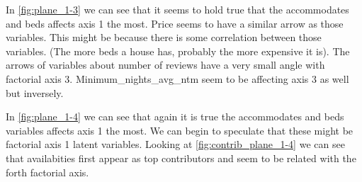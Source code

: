 \begin{comment}
In \cref{fig:plane_1-2} we are showing the factorial maps that represent the most variance among all our factorial axis. When looking at the numerical variables represented we can see that all the variables
related to reviews tend to have similar arrows, this makes sense 
because in the bivariate analysis we concluded that they were correlated.
Looking at \cref{fig:contrib_plane_1-2} we can see that the variables
with higher contribution are the ones about review scores and availability. As all review score variables have a small angle to the first factorial axis we can begin to speculate that this axis is 
mostly affected by these variables. Other variables like availability
and accommodates seem to contribute mostly to the second factorial axis, however these angles aren't as tight so they probably affect the first axis as well. 
\end{comment}


In \cref{fig:plane_1-3} we can see that it seems to hold true that the accommodates and beds affects axis 1 the most. Price 
seems to have a similar arrow as those variables. This might be
because there is some correlation between those variables. 
(The more beds a house has, probably the more expensive it is).
The arrows of variables about number of reviews have a very small angle with factorial axis 3. Minimum\_nights\_avg\_ntm seem to
be affecting axis 3 as well but inversely.



In \cref{fig:plane_1-4} we can see that again it is true
the accommodates and beds variables affects axis 1 the most. We can begin to speculate that these might be factorial axis 1
latent variables. Looking at \cref{fig:contrib_plane_1-4} we 
can see that availabities first appear as top contributors and seem to be related with the forth factorial axis.

\begin{comment}
The plane in \cref{fig:plane_1-4} seems to be mostly affected by review scores and the number of reviews.
In this specific plane number of reviews and accommodates seem to have a similar contribution but with
inverse relation. We can maybe relate the availability with the first plane, but as the global correlation
to this plane of this variable isn't has high we can't derive to much from this.
\end{comment}

